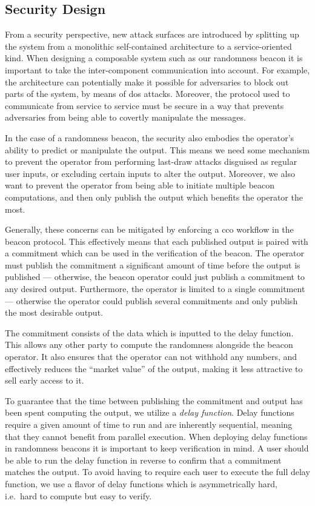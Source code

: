 \subsection{Security Design}

From a security perspective, new attack surfaces are introduced by splitting up the system from a monolithic self-contained architecture to a service-oriented kind.
When designing a composable system such as our randomness beacon it is important to take the inter-component communication into account.
For example, the architecture can potentially make it possible for adversaries to block out parts of the system, by means of \gls{dos} attacks.
Moreover, the protocol used to communicate from service to service must be secure in a way that prevents adversaries from being able to covertly manipulate the messages.

In the case of a randomness beacon, the security also embodies the operator's ability to predict or manipulate the output.
This means we need some mechanism to prevent the operator from performing last-draw attacks disguised as regular user inputs, or excluding certain inputs to alter the output.
Moreover, we also want to prevent the operator from being able to initiate multiple beacon computations, and then only publish the output which benefits the operator the most.

Generally, these concerns can be mitigated by enforcing a \gls{cco} workflow in the beacon protocol.
This effectively means that each published output is paired with a commitment which can be used in the verification of the beacon.
The operator must publish the commitment a significant amount of time before the output is published --- otherwise, the beacon operator could just publish a commitment to any desired output. Furthermore, the operator is limited to a single commitment --- otherwise the operator could publish several commitments and only publish the most desirable output.

The commitment consists of the data which is inputted to the delay function.
This allows any other party to compute the randomness alongside the beacon operator.
It also ensures that the operator can not withhold any numbers, and effectively reduces the \enquote{market value} of the output, making it less attractive to sell early access to it.

To guarantee that the time between publishing the commitment and output has been spent computing the output, we utilize a \emph{delay function}.
Delay functions require a given amount of time to run and are inherently sequential, meaning that they cannot benefit from parallel execution.
When deploying delay functions in randomness beacons it is important to keep verification in mind.
A user should be able to run the delay function in reverse to confirm that a commitment matches the output.
To avoid having to require each user to execute the full delay function, we use a flavor of delay functions which is asymmetrically hard, i.e.\ hard to compute but easy to verify.

